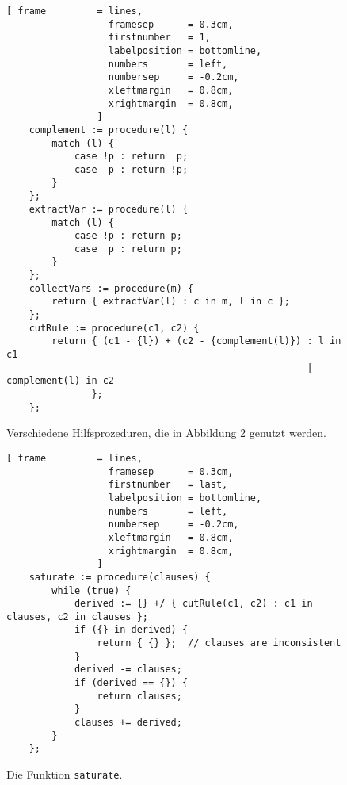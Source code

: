 \begin{figure}[!ht]
\centering
\begin{Verbatim}[ frame         = lines, 
                  framesep      = 0.3cm, 
                  firstnumber   = 1,
                  labelposition = bottomline,
                  numbers       = left,
                  numbersep     = -0.2cm,
                  xleftmargin   = 0.8cm,
                  xrightmargin  = 0.8cm,
                ]
    complement := procedure(l) {
        match (l) {
            case !p : return  p;
            case  p : return !p;
        }
    };
    extractVar := procedure(l) {
        match (l) {
            case !p : return p;
            case  p : return p;
        }
    };
    collectVars := procedure(m) {
        return { extractVar(l) : c in m, l in c };
    };
    cutRule := procedure(c1, c2) {
        return { (c1 - {l}) + (c2 - {complement(l)}) : l in c1
                                                     | complement(l) in c2
               };
    };
\end{Verbatim}
\vspace*{-0.3cm}
\caption{Verschiedene Hilfsprozeduren, die in Abbildung \ref{fig:completeness.stlx-2} genutzt werden.}
\label{fig:completeness.stlx-1}
\end{figure}

\begin{figure}[!ht]
\centering
\begin{Verbatim}[ frame         = lines, 
                  framesep      = 0.3cm, 
                  firstnumber   = last,
                  labelposition = bottomline,
                  numbers       = left,
                  numbersep     = -0.2cm,
                  xleftmargin   = 0.8cm,
                  xrightmargin  = 0.8cm,
                ]
    saturate := procedure(clauses) {
        while (true) {
            derived := {} +/ { cutRule(c1, c2) : c1 in clauses, c2 in clauses };
            if ({} in derived) {
                return { {} };  // clauses are inconsistent
            }
            derived -= clauses;
            if (derived == {}) {
                return clauses;
            }
            clauses += derived;
        }
    };
\end{Verbatim}
\vspace*{-0.3cm}
\caption{Die Funktion \texttt{saturate}.}
\label{fig:completeness.stlx-2}
\end{figure}

